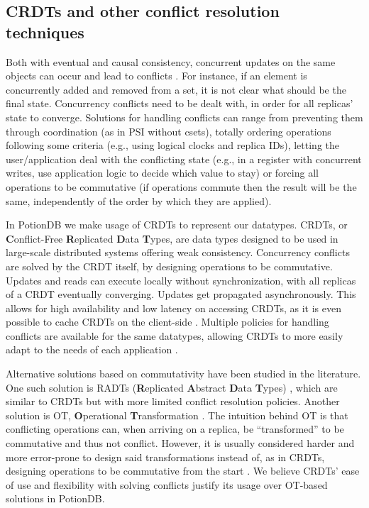 \subsection{CRDTs and other conflict resolution techniques}
\label{subsec:crdt}

Both with eventual and causal consistency, concurrent updates on the same objects can occur and lead to conflicts \cite{understandingEC}.
For instance, if an element is concurrently added and removed from a set, it is not clear what should be the final state.
Concurrency conflicts need to be dealt with, in order for all replicas' state to converge.
Solutions for handling conflicts can range from preventing them through coordination (as in PSI without csets), totally ordering operations following some criteria (e.g., using logical clocks and replica IDs), letting the user/application deal with the conflicting state (e.g., in a register with concurrent writes, use application logic to decide which value to stay) or forcing all operations to be commutative (if operations commute then the result will be the same, independently of the order by which they are applied).

In PotionDB we make usage of CRDTs \cite{crdt} to represent our datatypes.
CRDTs, or \textbf{C}onflict-Free  \textbf{R}eplicated \textbf{D}ata \textbf{T}ypes, are data types designed to be used in large-scale distributed systems offering weak consistency.
Concurrency conflicts are solved by the CRDT itself, by designing operations to be commutative.
Updates and reads can execute locally without synchronization, with all replicas of a CRDT eventually converging.
Updates get propagated asynchronously.
This allows for high availability and low latency on accessing CRDTs, as it is even possible to cache CRDTs on the client-side \cite{legion, swiftcloud, castineira2015collaborative}.
Multiple policies for handling conflicts are available for the same datatypes, allowing CRDTs to more easily adapt to the needs of each application \cite{crdtMultipolicy, crdt}.

Alternative solutions based on commutativity have been studied in the literature. 
One such solution is RADTs (\textbf{R}eplicated \textbf{A}bstract \textbf{D}ata \textbf{T}ypes) \cite{radt}, which are similar to CRDTs but with more limited conflict resolution policies.
Another solution is OT, \textbf{O}perational \textbf{T}ransformation \cite{ot, otCorrectness}.
The intuition behind OT is that conflicting operations can, when arriving on a replica, be ``transformed'' to be commutative and thus not conflict.
However, it is usually considered harder and more error-prone to design said transformations instead of, as in CRDTs, designing operations to be commutative from the start \cite{otCorrectness, crdt}.
We believe CRDTs' ease of use and flexibility with solving conflicts justify its usage over OT-based solutions in PotionDB.


